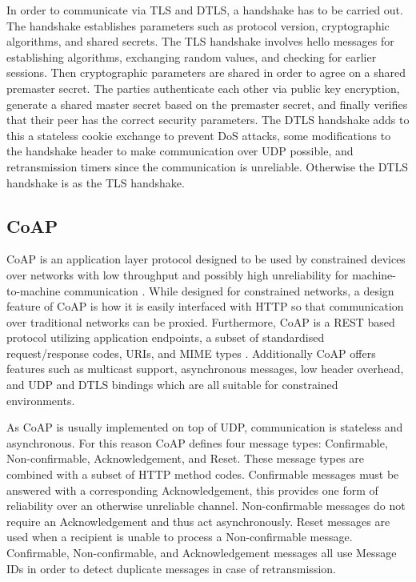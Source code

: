 \documentclass[0-thesis.tex]{subfiles}
\begin{document}
In order to communicate via TLS and DTLS, a handshake has to be carried out. The handshake
establishes parameters such as protocol version, cryptographic algorithms, and shared
secrets. The TLS handshake involves hello messages for establishing algorithms, exchanging
random values, and checking for earlier sessions. Then cryptographic parameters are shared
in order to agree on a shared premaster secret. The parties authenticate each other via
public key encryption, generate a shared master secret based on the premaster secret, and
finally verifies that their peer has the correct security parameters. The DTLS handshake
adds to this a stateless cookie exchange to prevent DoS attacks, some modifications to the
handshake header to make communication over UDP possible, and retransmission timers since
the communication is unreliable. Otherwise the DTLS handshake is as the TLS handshake.

\subsection{CoAP}
\label{ssec:coap}
CoAP is an application layer protocol designed to be used by constrained devices over networks
with low throughput and possibly high unreliability for machine-to-machine communication
\parencite{rfc7252}. While designed for constrained networks, a design feature of CoAP is
how it is easily interfaced with HTTP so that communication over traditional networks can
be proxied. Furthermore, CoAP is a REST based protocol utilizing application endpoints, a
subset of standardised request/response codes, URIs, and MIME types \parencite{rest}.
Additionally CoAP offers features such as multicast support, asynchronous messages, low
header overhead, and UDP and DTLS bindings which are all suitable for constrained
environments.

As CoAP is usually implemented on top of UDP, communication is stateless and asynchronous.
For this reason CoAP defines four message types: Confirmable, Non-confirmable,
Acknowledgement, and Reset. These message types are combined with a subset of HTTP method
codes. Confirmable messages must be answered with a corresponding Acknowledgement, this
provides one form of reliability over an otherwise unreliable channel. Non-confirmable
messages do not require an Acknowledgement and thus act asynchronously. Reset messages are
used when a recipient is unable to process a Non-confirmable message. Confirmable,
Non-confirmable, and Acknowledgement messages all use Message IDs in order to detect
duplicate messages in case of retransmission.
\end{document}
